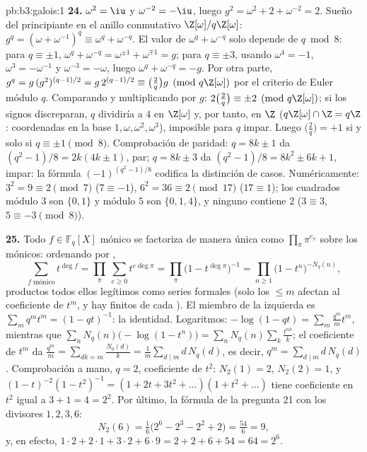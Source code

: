 \begin{solution}{pb:b3:galois:1}
\textbf{24.} $\omega^2 = \iu$ y $\omega^{-2} = -\iu$, luego
$g^2 = \omega^2 + 2 + \omega^{-2} = 2$. Sueño del principiante en el
anillo conmutativo $\Z[\omega]/q\Z[\omega]$: $g^q =
(\omega + \omega^{-1})^q \equiv \omega^q + \omega^{-q}$. El valor de
$\omega^q + \omega^{-q}$ solo depende de $q \bmod 8$: para
$q \equiv \pm1$, $\omega^q + \omega^{-q} = \omega^{\pm1} +
\omega^{\mp1} = g$; para $q \equiv \pm3$, usando $\omega^4 =
-1$, $\omega^{3} = -\omega^{-1}$ y $\omega^{-3} = -\omega$, luego
$\omega^q + \omega^{-q} = -g$. Por otra parte, $g^q =
g\,(g^2)^{(q-1)/2} = g\,2^{(q-1)/2} \equiv \bigl(\frac2q\bigr)
g \pmod{q\Z[\omega]}$ por el criterio de Euler módulo $q$. Comparando y
multiplicando por $g$: $2\bigl(\frac2q\bigr) \equiv
\pm2 \pmod{q\Z[\omega]}$; si los signos discreparan, $q$ dividiría a $4$
en $\Z[\omega]$ y, por tanto, en $\Z$ ($q\Z[\omega] \cap
\Z = q\Z$: coordenadas en la base $1, \omega, \omega^2,
\omega^3$), imposible para $q$ impar. Luego $\bigl(\frac2q\bigr) =
+1$ si y solo si $q \equiv \pm1 \pmod 8$. Comprobación de paridad:
$q = 8k \pm 1$ da $(q^2 - 1)/8 = 2k(4k \pm 1)$, par; $q = 8k \pm 3$ da
$(q^2 - 1)/8 = 8k^2 \pm 6k + 1$, impar: la fórmula $(-1)^{(q^2-1)/8}$
codifica la distinción de casos. Numéricamente: $3^2
= 9 \equiv 2 \pmod 7$ ($7 \equiv -1$), $6^2 = 36 \equiv 2
\pmod{17}$ ($17 \equiv 1$); los cuadrados módulo $3$ son $\{0,
1\}$ y módulo $5$ son $\{0, 1, 4\}$, y ninguno contiene $2$
($3 \equiv 3$, $5 \equiv -3 \pmod 8$).

\textbf{25.} Todo $f \in \mathbb F_q[X]$ mónico se factoriza de manera
única como $\prod_\pi\pi^{e_\pi}$ sobre los
 mónicos: ordenando por
,
\[
\sum_{f \text{ mónico}}t^{\deg f}
= \prod_\pi\ \sum_{e \geq 0}t^{e\deg\pi}
= \prod_\pi\bigl(1 - t^{\deg\pi}\bigr)^{-1}
= \prod_{n \geq 1}\bigl(1 - t^n\bigr)^{-N_q(n)},
\]
productos todos ellos legítimos como series formales (solo los
 $\leq m$ afectan al coeficiente
de $t^m$, y hay finitos 
de cada ). El miembro de la
izquierda es $\sum_m
q^mt^m = (1 - qt)^{-1}$: la identidad. Logaritmos: $-\log(1 -
qt) = \sum_m\frac{q^m}mt^m$, mientras que $\sum_nN_q(n)\bigl(-\log(1
- t^n)\bigr) = \sum_nN_q(n)\sum_k\frac{t^{nk}}k$; el coeficiente de
$t^m$ da $\frac{q^m}m = \sum_{dk = m}
\frac{N_q(d)}k = \frac1m\sum_{d \mid m}d\,N_q(d)$, es decir,
$q^m = \sum_{d\mid m}d\,N_q(d)$. Comprobación a mano, $q = 2$,
coeficiente de $t^2$: $N_2(1) = 2$, $N_2(2) = 1$, y
$(1 - t)^{-2}(1 - t^2)^{-1} = (1 + 2t + 3t^2 + \dots)(1 + t^2
+ \dots)$ tiene coeficiente en $t^2$ igual a $3 + 1 = 4 = 2^2$. Por
último, la fórmula de la pregunta 21 con los divisores $1, 2, 3, 6$:
\[
N_2(6) = \tfrac16\bigl(2^6 - 2^3 - 2^2 + 2\bigr)
= \tfrac{54}6 = 9,
\]
y, en efecto, $1\cdot2 + 2\cdot1 + 3\cdot2 + 6\cdot9 = 2 + 2 +
6 + 54 = 64 = 2^6$.
\end{solution}
